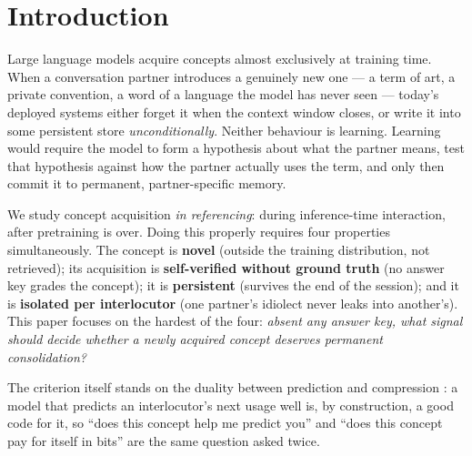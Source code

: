 \documentclass[11pt]{article}
\begin{document}
\section{Introduction}

Large language models acquire concepts almost exclusively at training time. When a
conversation partner introduces a genuinely new one --- a term of art, a private
convention, a word of a language the model has never seen --- today's deployed systems
either forget it when the context window closes, or write it into some persistent store
\emph{unconditionally}. Neither behaviour is learning. Learning would require the model to
form a hypothesis about what the partner means, test that hypothesis against how the
partner actually uses the term, and only then commit it to permanent, partner-specific
memory.

We study concept acquisition \emph{in referencing}: during inference-time interaction,
after pretraining is over. Doing this properly requires four properties simultaneously.
The concept is \textbf{novel} (outside the training distribution, not retrieved); its
acquisition is \textbf{self-verified without ground truth} (no answer key grades the
concept); it is \textbf{persistent} (survives the end of the session); and it is
\textbf{isolated per interlocutor} (one partner's idiolect never leaks into another's).
This paper focuses on the hardest of the four: \emph{absent any answer key, what signal
should decide whether a newly acquired concept deserves permanent consolidation?}

The criterion itself stands on the duality between prediction and compression
\citep{deletang2024compression}: a model that predicts an interlocutor's next usage well
is, by construction, a good code for it, so ``does this concept help me predict you'' and
``does this concept pay for itself in bits'' are the same question asked twice.
\end{document}
